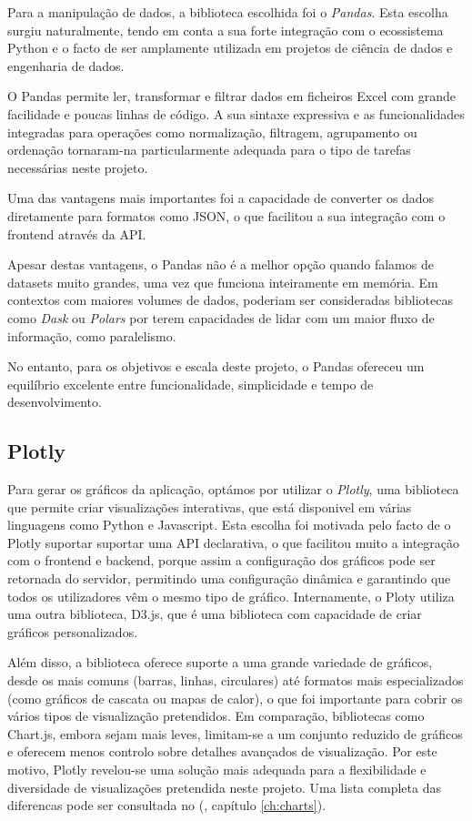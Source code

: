 Para a manipulação de dados, a biblioteca escolhida foi o \textit{Pandas}. Esta escolha surgiu naturalmente, tendo em conta a sua forte integração com o ecossistema Python e o facto de ser amplamente utilizada em projetos de ciência de dados e engenharia de dados.

O Pandas permite ler, transformar e filtrar dados em ficheiros Excel com grande facilidade e poucas linhas de código. A sua sintaxe expressiva e as funcionalidades integradas para operações como normalização, filtragem, agrupamento ou ordenação tornaram-na particularmente adequada para o tipo de tarefas necessárias neste projeto.

Uma das vantagens mais importantes foi a capacidade de converter os dados diretamente para formatos como JSON, o que facilitou a sua integração com o frontend através da API.

Apesar destas vantagens, o Pandas não é a melhor opção quando falamos de datasets muito grandes, uma vez que funciona inteiramente em memória. Em contextos com maiores volumes de dados, poderiam ser consideradas bibliotecas como \textit{Dask} ou \textit{Polars} por terem capacidades de lidar com um maior fluxo de informação, como paralelismo.

No entanto, para os objetivos e escala deste projeto, o Pandas ofereceu um equilíbrio excelente entre funcionalidade, simplicidade e tempo de desenvolvimento.

\subsection{Plotly}

Para gerar os gráficos da aplicação, optámos por utilizar o \textit{Plotly}, uma biblioteca  que permite criar visualizações interativas, que está disponivel em várias linguagens como Python e Javascript. Esta escolha foi motivada pelo facto de o Plotly suportar suportar uma API declarativa, o que facilitou muito a integração com o frontend e backend, porque assim a configuração dos gráficos pode ser retornada do servidor, permitindo uma configuração dinâmica e garantindo que todos os utilizadores vêm o mesmo tipo de gráfico. Internamente, o Ploty utiliza uma outra biblioteca, D3.js, que é uma biblioteca com capacidade de criar gráficos personalizados.

Além disso, a biblioteca oferece suporte a uma grande variedade de gráficos, desde os mais comuns (barras, linhas, circulares) até formatos mais especializados (como gráficos de cascata ou mapas de calor), o que foi importante para cobrir os vários tipos de visualização pretendidos. Em comparação, bibliotecas como Chart.js, embora sejam mais leves, limitam-se a um conjunto reduzido de gráficos e oferecem menos controlo sobre detalhes avançados de visualização. Por este motivo, Plotly revelou-se uma solução mais adequada para a flexibilidade e diversidade de visualizações pretendida neste projeto. Uma lista completa das diferencas pode ser consultada no (\cf, capítulo \ref{ch:charts}).

